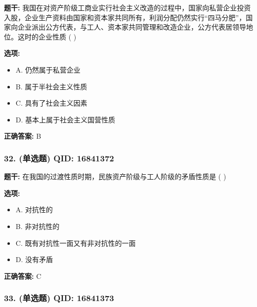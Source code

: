 \documentclass[12pt,UTF8]{ctexart}
\begin{document}
\textbf{题干:}
我国在对资产阶级工商业实行社会主义改造的过程中，国家向私营企业投资入股，企业生产资料由国家和资本家共同所有，利润分配仍然实行“四马分肥”，国家向企业派出公方代表，与工人、资本家共同管理和改造企业，公方代表居领导地位。这时的企业性质 ( )

\textbf{选项:}
\begin{itemize}[leftmargin=*]

  \item A. 仍然属于私营企业

  \item B. 属于半社会主义性质

  \item C. 具有了社会主义因素

  \item D. 基本上属于社会主义国营性质

\end{itemize}

\textbf{正确答案:}
B

\vspace{0.3em}\hrulefill\vspace{0.7em}

\subsubsection*{32. (单选题) \small QID: 16841372}

\textbf{题干:}
在我国的过渡性质时期，民族资产阶级与工人阶级的矛盾性质是 ( )

\textbf{选项:}
\begin{itemize}[leftmargin=*]

  \item A. 对抗性的

  \item B. 非对抗性的

  \item C. 既有对抗性一面又有非对抗性的一面

  \item D. 没有矛盾

\end{itemize}

\textbf{正确答案:}
C

\vspace{0.3em}\hrulefill\vspace{0.7em}

\subsubsection*{33. (单选题) \small QID: 16841373}
\end{document}
